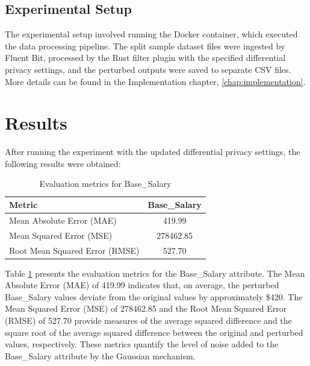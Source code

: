 \subsection{Experimental Setup}
The experimental setup involved running the Docker container, which executed the data processing pipeline. The split sample dataset files were ingested by Fluent Bit, processed by the Rust filter plugin with the specified differential privacy settings, and the perturbed outputs were saved to separate CSV files. More details can be found in the Implementation chapter, \ref{chap:implementation}.
\newpage
\section{Results}
After running the experiment with the updated differential privacy settings, the following results were obtained:
\begin{table}[H]
\centering
\begin{tabular}{l|c}
\hline
\textbf{Metric} & \textbf{Base\_Salary} \\
\hline
Mean Absolute Error (MAE) & 419.99 \\
Mean Squared Error (MSE) & 278462.85 \\
Root Mean Squared Error (RMSE) & 527.70 \\
\hline
\end{tabular}
\caption{Evaluation metrics for Base\_Salary}
\label{tab:base_salary_metrics}
\end{table}
Table \ref{tab:base_salary_metrics} presents the evaluation metrics for the Base\_Salary attribute. The Mean Absolute Error (MAE) of 419.99 indicates that, on average, the perturbed Base\_Salary values deviate from the original values by approximately \$420. The Mean Squared Error (MSE) of 278462.85 and the Root Mean Squared Error (RMSE) of 527.70 provide measures of the average squared difference and the square root of the average squared difference between the original and perturbed values, respectively. These metrics quantify the level of noise added to the Base\_Salary attribute by the Gaussian mechanism.

